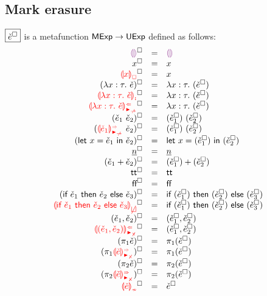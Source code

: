 \documentclass[formalism.tex]{subfiles}
\begin{document}
\subsection{Mark erasure}
\label{sec:marked-mark-erasure}
$\judgbox{\erase{\ECMV}}$ is a metafunction ${\normalfont\textsf{MExp}} \to {\normalfont\textsf{UExp}}$ defined as follows:
%
\newcommand{\erasesToRow}[2]{\erase{#1} & = & #2}
\[\begin{array}{rcl}
  \erasesToRow{\ECEHole}{\EEHole} \\
  \erasesToRow{x}{x} \\
  \erasesToRow{\ECFree{x}}{x} \\
  \erasesToRow{(\ECLam{x}{\TMV}{\ECMV})}{\ELam{x}{\TMV}{(\erase{\ECMV})}} \\
  \erasesToRow{\ECLamInconAsc{x}{\TMV}{\ECMV}}{\ELam{x}{\TMV}{(\erase{\ECMV})}} \\
  \erasesToRow{\ECLamAnaNonMatchedArrow{x}{\TMV}{\ECMV}}{\ECLam{x}{\TMV}{(\erase{\ECMV})}} \\
  \erasesToRow{(\ECAp{\ECMV_1}{\ECMV_2})}{\EAp{(\erase{\ECMV_1})}{(\erase{\ECMV_2})}} \\
  \erasesToRow{(\ECApSynNonMatchedArrow{\ECMV_1}{\ECMV_2})}{\ECAp{(\erase{\ECMV_1})}{(\erase{\ECMV_2})}} \\
  \erasesToRow{(\ECLet{x}{\ECMV_1}{\ECMV_2})}{\ELet{x}{(\erase{\ECMV_1})}{(\erase{\ECMV_2})}} \\
  \erasesToRow{\ECNumMV}{\ENumMV} \\
  \erasesToRow{(\ECPlus{\ECMV_1}{\ECMV_2})}{\EPlus{(\erase{\ECMV_1})}{(\erase{\ECMV_2})}} \\
  \erasesToRow{\ECTrue}{\ETrue} \\
  \erasesToRow{\ECFalse}{\EFalse} \\
  \erasesToRow{(\ECIf{\ECMV_1}{\ECMV_2}{\ECMV_3})}{\EIf{(\erase{\ECMV_1})}{(\erase{\ECMV_2})}{(\erase{\ECMV_3})}} \\
  \erasesToRow{\ECInconBr{\ECMV_1}{\ECMV_2}{\ECMV_3}}{\EIf{(\erase{\ECMV_1})}{(\erase{\ECMV_2})}{(\erase{\ECMV_3})}} \\
  \erasesToRow{\ECPair{\ECMV_1}{\ECMV_2}}{\ECPair{\erase{\ECMV_1}}{\erase{\ECMV_2}}} \\
  \erasesToRow{\ECPairAnaNonMatchedProd{\ECMV_1}{\ECMV_2}}{\ECPair{\erase{\ECMV_1}}{\erase{\ECMV_2}}} \\
  \erasesToRow{(\ECProjL{\ECMV})}{\ECProjL{(\erase{\ECMV})}} \\
  \erasesToRow{(\ECProjLSynNonMatchedProd{\ECMV})}{\ECProjL{(\erase{\ECMV})}} \\
  \erasesToRow{(\ECProjR{\ECMV})}{\ECProjR{(\erase{\ECMV})}} \\
  \erasesToRow{(\ECProjRSynNonMatchedProd{\ECMV})}{\ECProjR{(\erase{\ECMV})}} \\
  \erasesToRow{\ECInconType{\ECMV}}{\erase{\ECMV}} \\
\end{array}\]
\end{document}
